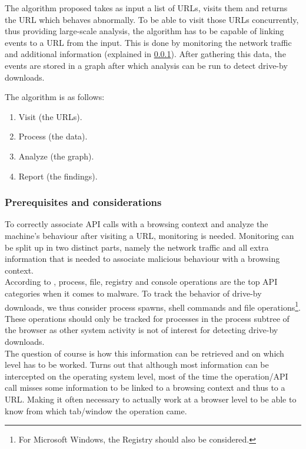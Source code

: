 The algorithm proposed takes as input a list of URLs, visits them and returns the URL which behaves abnormally. To be able to visit those URLs concurrently, thus providing large-scale analysis, the algorithm has to be capable of linking events to a URL from the input. This is done by monitoring the network traffic and additional information (explained in \ref{sec:prereq}). After gathering this data, the events are stored in a graph after which analysis can be run to detect drive-by downloads.

The algorithm is as follows:

\begin{changemargin}{5cm}{0cm}
\begin{enumerate}
\item Visit (the URLs).
\item Process (the data).
\item Analyze (the graph).
\item Report (the findings).
\end{enumerate}
\end{changemargin}

\subsubsection{Prerequisites and considerations}
\label{sec:prereq}

To correctly associate API calls with a browsing context and analyze the machine's behaviour after visiting a URL, monitoring is needed. Monitoring can be split up in two distinct parts, namely the network traffic and all extra information that is needed to associate malicious behaviour with a browsing context.\\

According to \cite{Sami:2010:MDB:1774088.1774303}, process, file, registry and console operations are the top API categories when it comes to malware. To track the behavior of drive-by downloads, we thus consider process spawns, shell commands and file operations\footnote{For Microsoft Windows, the Registry should also be considered.}. These operations should only be tracked for processes in the process subtree of the browser as other system activity is not of interest for detecting drive-by downloads.\\

The question of course is how this information can be retrieved and on which level has to be worked. Turns out that although most information can be intercepted on the operating system level, most of the time the operation/API call misses some information to be linked to a browsing context and thus to a URL. Making it often necessary to actually work at a browser level to be able to know from which tab/window the operation came.\\%

